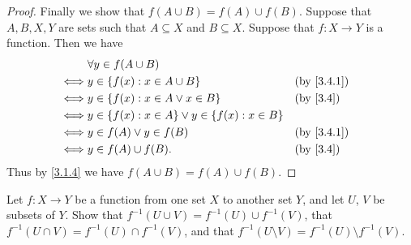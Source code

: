 \begin{proof}
  Finally we show that \(f(A \cup B) = f(A) \cup f(B)\).
  Suppose that \(A, B, X, Y\) are sets such that \(A \subseteq X\) and \(B \subseteq X\).
  Suppose that \(f : X \to Y\) is a function.
  Then we have
  \begin{align*}
         & \forall y \in f(A \cup B)                                                  \\
    \iff & y \in \set{f(x) : x \in A \cup B}                          &  & \by{3.4.1} \\
    \iff & y \in \set{f(x) : x \in A \lor x \in B}                    &  & \by{3.4}   \\
    \iff & y \in \set{f(x) : x \in A} \lor y \in \set{f(x) : x \in B}                 \\
    \iff & y \in f(A) \lor y \in f(B)                                 &  & \by{3.4.1} \\
    \iff & y \in f(A) \cup f(B).                                      &  & \by{3.4}
  \end{align*}
  Thus by \cref{3.1.4} we have \(f(A \cup B) = f(A) \cup f(B)\).
\end{proof}

\begin{ex}\label{ex:3.4.4}
  Let \(f : X \to Y\) be a function from one set \(X\) to another set \(Y\), and let \(U\), \(V\) be subsets of \(Y\). Show that \(f^{-1}(U \cup V) = f^{-1}(U) \cup f^{-1}(V)\), that
  \(f^{-1}(U \cap V) = f^{-1}(U) \cap f^{-1}(V)\), and that \(f^{-1}(U \setminus V) = f^{-1}(U) \setminus f^{-1}(V)\).
\end{ex}

